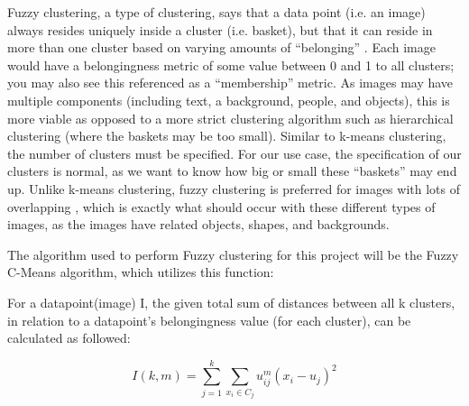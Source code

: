 \documentclass[10pt,twocolumn]{article}
\begin{document}
Fuzzy clustering, a type of clustering, says that a data point (i.e. an image) always resides uniquely inside a cluster (i.e. basket), but that it can reside in more than one cluster based on varying amounts of “belonging” \cite{PrasadClustering}. Each image would have a belongingness metric of some value between 0 and 1 to all clusters; you may also see this referenced as a “membership” metric. As images may have multiple components (including text, a background, people, and objects), this is more viable as opposed to a more strict clustering algorithm such as hierarchical clustering (where the baskets may be too small). Similar to k-means clustering, the number of clusters must be specified. For our use case, the specification of our clusters is normal, as we want to know how big or small these “baskets” may end up. Unlike k-means clustering, fuzzy clustering is preferred for images with lots of overlapping \cite{PrasadClustering}, which is exactly what should occur with these different types of images, as the images have related objects, shapes, and backgrounds.

The algorithm used to perform Fuzzy clustering for this project will be the Fuzzy C-Means algorithm, which utilizes this function:

For a datapoint(image) I, the given total sum of distances between all k clusters, in relation to a datapoint's belongingness value (for each cluster),
can be calculated as followed:

\[ I(k, m)  =  \sum_{j=1}^{k} \sum_{x_i \in C_j} u_{ij}^{m}(x_i - u_j)^2 \]
\end{document}
